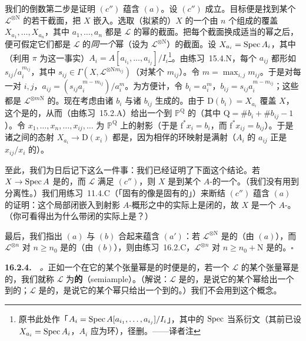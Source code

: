 我们的倒数第二步是证明 $(c'')$ 蕴含 $(a)$。设 $(c'')$ 成立。目标便是找到某个 $\mathscr{L}^{\otimes\mathrm{N}}$ 的若干截面，把 $X$ 嵌入\trProjectiveSpace。选取（拟紧的）$X$ 的一个由 $n$ 个\trAffine\trOpenSubset{}组成的覆盖 $X_{a_1},\dots,X_{a_n}$，其中 $a_1,\dots,a_n$ 都是 $\mathscr{L}$ 的幂的截面。把每个截面换成适当的幂之后，便可假定它们都是 $\mathscr{L}$ 的\emph{同一个}幂（设为 $\mathscr{L}^{\otimes\mathrm{N}}$）的截面。设 $X_{a_i}=\operatorname{Spec} A_i$，其中（利用 $\pi$ 为\trFiniteType{}这一事实）$A_i=A[a_{i_1},\dots,a_{i_j}]/I_i$\footnote{原书此处作「$A_i=\operatorname{Spec} A[a_{i_1},\dots,a_{i_j}]/I_i$」，其中的 $\operatorname{Spec}$ 当系衍文（其前已设 $X_{a_i}=\operatorname{Spec} A_i$，$A_i$ 应为环），径删。——译者注}。由\mbox{练习~15.4.N}，每个 $a_{ij}$ 都形如 $s_{ij}/a_i^{m_{ij}}$，其中 $s_{ij}\in\Gamma(X,\mathscr{L}^{\otimes\mathrm{N}m_{ij}})$（对某个 $m_{ij}$）。令 $m=\max_{i,j}m_{ij}$。于是对每一对 $i,j$，$a_{ij}=(s_{ij}a_i^{m-m_{ij}})/a_i^{m}$。为方便计，令 $b_i=a_i^{m}$，$b_{ij}=s_{ij}a_i^{m-m_{ij}}$；这些都是 $\mathscr{L}^{\otimes m\mathrm{N}}$ 的\trGlobalSections。现在考虑由诸 $b_i$ 与诸 $b_{ij}$ 生成的\trLinearSystem。由于 $\mathrm{D}(b_i)=X_{a_i}$ 覆盖 $X$，这个\trLinearSystem{}是\trBasePointFree{}的，从而（由\mbox{练习~15.2.A}）给出一个到 $\mathbb{P}^{\mathrm{Q}}$ 的\trMorphism（其中 $\mathrm{Q}=\#b_i+\#b_{ij}-1$）。令 $x_1,\dots,x_n,\dots,x_{ij},\dots$ 为 $\mathbb{P}^{\mathrm{Q}}$ 上的射影\trCoordinate（于是 $\mathrm{f}^*x_i=b_i$，而 $\mathrm{f}^*x_{ij}=b_{ij}$）。于是诸\trAffineScheme{}之间的态射 $X_{a_i}\to\mathrm{D}(x_i)$ 都是\trClosedEmbedding，因为相伴的环映射是满射（$A_i$ 的\trGenerator{} $a_{ij}$ 正是 $x_{ij}/x_i$ 的\trImage）。

至此，我们为日后记下这么一件事：我们已经证明了下面这个结论。若 $X\to\operatorname{Spec} A$ 是\trFiniteType{}的，而 $\mathscr{L}$ 满足 $(c'')$，则 $X$ 是到某个\trProjective{} $A$-\trScheme{}的一个\trLocallyClosedEmbedding。（我们没有用到分离性。）我们用\mbox{练习~11.4.C}（「固有的像是固有的」）来断结 $(c'')$ 蕴含 $(a)$ 的证明：这个局部闭嵌入到射影 $A$-概形之中的\trImage{}实际上是闭的，故 $X$ 是一个\trProjective{} $A$-\trScheme。（你可看得出为什么带闭\trImage{}的\trLocallyClosedEmbedding{}实际上是\trClosedEmbedding？）

最后，我们指出 $(a)$ 与 $(b)$ 合起来蕴含 $(a')$：若 $\mathscr{L}^{\otimes\mathrm{N}}$ 是\trVeryAmple{}的（由 $(a)$），而 $\mathscr{L}^{\otimes n}$ 对 $n\ge n_0$ 是\trBasePointFree{}的（由 $(b)$），则由\mbox{练习~16.2.C}，$\mathscr{L}^{\otimes n}$ 对 $n\ge n_0+\mathrm{N}$ 是\trVeryAmple{}的。\hfill$\square$

\textbf{16.2.4.}\ \extrahard\ \emph{\trSemiample\trLineBundle。}\quad 正如一个\trInvertibleSheaf{}在它的某个张量幂是\trVeryAmple{}的时便是\trAmple{}的，若一个\trInvertibleSheaf{} $\mathscr{L}$ 的某个张量幂是\trBasePointFree{}的，我们就称 $\mathscr{L}$ 为\textbf{\trSemiample{}的}（semiample）。（解说：$\mathscr{L}$ 是\trAmple{}的，是说它的某个幂给出一个到\trProjectiveSpace{}的\trClosedEmbedding；$\mathscr{L}$ 是\trSemiample{}的，是说它的某个幂只给出一个到\trProjectiveSpace{}的\emph{\trMorphism}。）我们不会用到这个概念。

